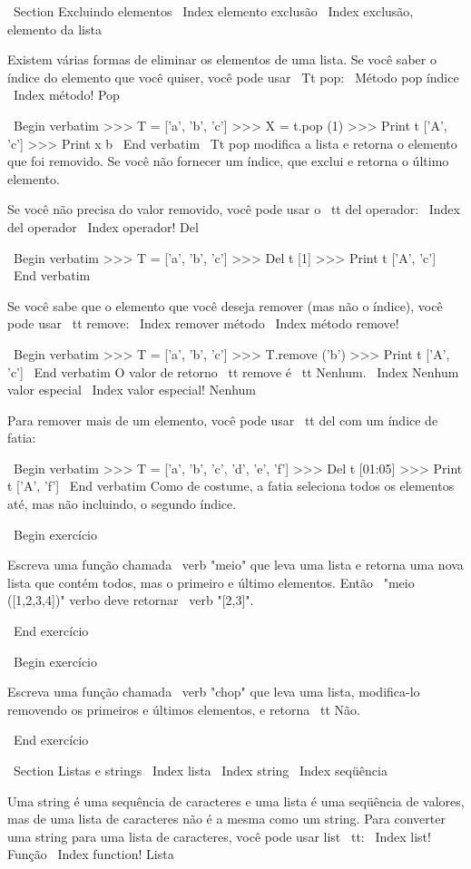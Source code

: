\documentclass[10pt]{book}
\begin{document}
\begin {itemize}
{{{{{{\ Section {Excluindo elementos}
\ Index {elemento exclusão}
\ Index {exclusão, elemento da lista}

Existem várias formas de eliminar os elementos de uma lista. Se você
saber o índice do elemento que você quiser, você pode usar
{\ Tt pop}:
\ {Método pop} índice
\ Index {método! Pop}

\ Begin {verbatim}
>>> T = ['a', 'b', 'c']
>>> X = t.pop (1)
>>> Print t
['A', 'c']
>>> Print x
b
\ End {verbatim}
%
{\ Tt pop} modifica a lista e retorna o elemento que foi removido.
Se você não fornecer um índice, que exclui e retorna o
último elemento.

Se você não precisa do valor removido, você pode usar o {\ tt del}
operador:
\ Index {del operador}
\ Index {operador! Del}

\ Begin {verbatim}
>>> T = ['a', 'b', 'c']
>>> Del t [1]
>>> Print t
['A', 'c']
\ End {verbatim}
%

Se você sabe que o elemento que você deseja remover (mas não o índice), você
pode usar {\ tt remove}:
\ Index {remover método}
\ Index {método remove!}

\ Begin {verbatim}
>>> T = ['a', 'b', 'c']
>>> T.remove ('b')
>>> Print t
['A', 'c']
\ End {verbatim}
%
O valor de retorno {\ tt remove} é {\ tt Nenhum}.
\ Index {Nenhum valor especial}
\ Index {valor especial! Nenhum}

Para remover mais de um elemento, você pode usar {\ tt del} com
um índice de fatia:

\ Begin {verbatim}
>>> T = ['a', 'b', 'c', 'd', 'e', ​​'f']
>>> Del t [01:05]
>>> Print t
['A', 'f']
\ End {verbatim}
%
Como de costume, a fatia seleciona todos os elementos até, mas não
incluindo, o segundo índice.

\ Begin {} exercício

Escreva uma função chamada \ verb "meio" que leva uma lista e
retorna uma nova lista que contém todos, mas o primeiro e último
elementos. Então \ "meio ([1,2,3,4])" verbo deve retornar \ verb "[2,3]".

\ End {} exercício

\ Begin {} exercício

Escreva uma função chamada \ verb "chop" que leva uma lista, modifica-lo
removendo os primeiros e últimos elementos, e retorna {\ tt Não}.

\ End {} exercício


\ Section {Listas e strings}
\ Index {lista}
\ Index {string}
\ Index {seqüência}

Uma string é uma sequência de caracteres e uma lista é uma seqüência
de valores, mas de uma lista de caracteres não é a mesma como um
string. Para converter uma string para uma lista de caracteres,
você pode usar {list \ tt}:
\ Index {list! Função}
\ Index {function! Lista}

}}}}}}
\end{itemize}
\end{document}
